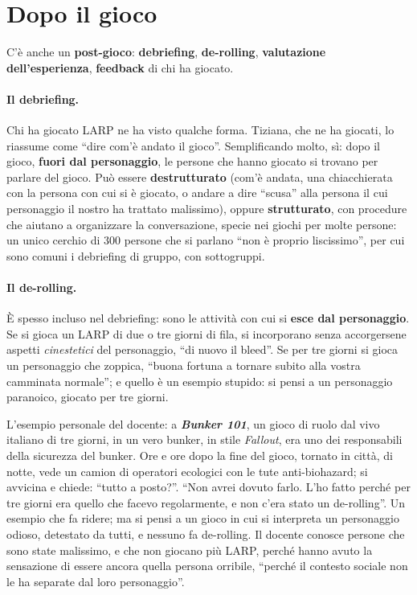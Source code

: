 \section{Dopo il gioco}
\label{a5:sec:dopo}

C'è anche un \textbf{post-gioco}: \textbf{debriefing}, \textbf{de-rolling},
\textbf{valutazione dell'esperienza}, \textbf{feedback} di chi ha giocato.

\paragraph{Il debriefing.} Chi ha giocato LARP ne ha visto qualche forma. Tiziana,
che ne ha giocati, lo riassume come ``dire com'è andato il gioco''. Semplificando
molto, sì: dopo il gioco, \textbf{fuori dal personaggio}, le persone che hanno
giocato si trovano per parlare del gioco. Può essere \textbf{destrutturato} (com'è
andata, una chiacchierata con la persona con cui si è giocato, o andare a dire ``scusa''
alla persona il cui personaggio il nostro ha trattato malissimo), oppure
\textbf{strutturato}, con procedure che aiutano a organizzare la conversazione, specie
nei giochi per molte persone: un unico cerchio di 300 persone che si parlano ``non è
proprio liscissimo'', per cui sono comuni i debriefing di gruppo, con sottogruppi.

\paragraph{Il de-rolling.} È spesso incluso nel debriefing: sono le attività con cui si
\textbf{esce dal personaggio}. Se si gioca un LARP di due o tre giorni di fila, si
incorporano senza accorgersene aspetti \emph{cinestetici} del personaggio, ``di nuovo
il bleed''. Se per tre giorni si gioca un personaggio che zoppica, ``buona fortuna a
tornare subito alla vostra camminata normale''; e quello è un esempio stupido: si
pensi a un personaggio paranoico, giocato per tre giorni.

L'esempio personale del docente: a \textbf{\emph{Bunker 101}}, un gioco di ruolo dal
vivo italiano di tre giorni, in un vero bunker, in stile \emph{Fallout}, era uno dei
responsabili della sicurezza del bunker. Ore e ore dopo la fine del gioco, tornato in
città, di notte, vede un camion di operatori ecologici con le tute anti-biohazard; si
avvicina e chiede: ``tutto a posto?''. ``Non avrei dovuto farlo. L'ho fatto perché per
tre giorni era quello che facevo regolarmente, e non c'era stato un de-rolling''. Un
esempio che fa ridere; ma si pensi a un gioco in cui si interpreta un personaggio
odioso, detestato da tutti, e nessuno fa de-rolling. Il docente conosce persone che
sono state malissimo, e che non giocano più LARP, perché hanno avuto la sensazione di
essere ancora quella persona orribile, ``perché il contesto sociale non le ha separate
dal loro personaggio''.

